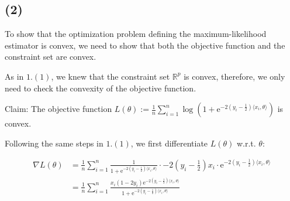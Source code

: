 \documentclass{article}
\begin{document}
\begin{comment}
\begin{equation*}
\frac{\mathrm{e}^{\langle x_i, \theta \rangle}}{1 + \mathrm{e}^{\langle x_i, \theta \rangle}} \cdot x_i
\end{equation*}

Thus, we can rewrite $(1)$ as:

\begin{align*}
&n \cdot \mathsf{P}(y_i = 1) \cdot \left( \frac{- x_i \mathrm{e}^{-\langle x_i, \theta \rangle}}{1 + \mathrm{e}^{-\langle x_i, \theta \rangle}} \right) + n \cdot \mathsf{P}(y_i = 0) \cdot \left( \frac{x_i \mathrm{e}^{\langle x_i, \theta \rangle}}{1 + e^{\langle x_i, \theta \rangle}} \right) = 0 \\
\Rightarrow \ &n \cdot \frac{1}{1 + \mathrm{e}^{-\langle x_i, \theta^\natural \rangle}} \cdot \left( \frac{- x_i}{1 + \mathrm{e}^{-\langle x_i, \theta^\natural \rangle}} \right) + n \cdot \left(\frac{\mathrm{e}^{-\langle x_i, \theta^\natural \rangle}}{1 + \mathrm{e}^{-\langle x_i, \theta^\natural \rangle}} \right) \cdot \left( \frac{x_i}{1 + \mathrm{e}^{\langle x_i, \theta^\natural \rangle}} \right) = 0
\end{align*}
\end{comment}

\subsection*{(2)}

To show that the optimization problem defining the maximum-likelihood estimator is convex,
we need to show that both the objective function and the constraint set are convex.
\bigskip

As in $1.(1)$, we knew that the constraint set $\mathbb{R}^p$ is convex,
therefore, we only need to check the convexity of the objective function.
\bigskip

Claim: The objective function 
$L (\theta) := \frac{1}{n} \sum_{i = 1}^n \log \left( 1 + \mathrm{e}^{-2(y_i - \frac{1}{2})\langle x_i, \theta \rangle} \right)$ is convex.

Following the same steps in $1.(1)$, we first differentiate $L (\theta)$ w.r.t. $\theta$:

\begin{align*}
    \nabla L(\theta) 
    &= \frac{1}{n} \sum_{i = 1}^n \frac{1}{1 + \mathrm{e}^{-2(y_i - \frac{1}{2})\langle x_i, \theta \rangle}} \cdot -2(y_i - \frac{1}{2}) x_i \cdot \mathrm{e}^{-2(y_i - \frac{1}{2})\langle x_i, \theta \rangle} \\
    &= \frac{1}{n} \sum_{i = 1}^n \frac{x_i(1 - 2y_i)\mathrm{e}^{-2(y_i - \frac{1}{2})\langle x_i, \theta \rangle}}{1 + \mathrm{e}^{-2(y_i - \frac{1}{2})\langle x_i, \theta \rangle}}
\end{align*}
\end{document}
